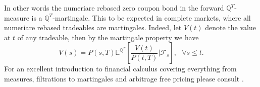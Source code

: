 In other words the numeriare rebased zero coupon bond in the forward
$\mathbb Q^T$-measure is a $\mathbb Q^T$-martingale. This to be
expected in complete markets, where all numeriare rebased tradeables
are martingales. Indeed, let $V(t)$ denote the value at $t$ of any
tradeable, then by the martingale property we have
\begin{equation} V(s) = P(s,T) \mathbb E^{\mathbb
Q^T}[\frac{V(t)}{P(t,T)} | \mathcal F_s], ~~~\forall s \le t.
\end{equation}
For an excellent introduction to financial calculus covering
everything from measures, filtrations to martingales and arbitrage
free pricing please consult \cite{BOOK:RENNIE}.

